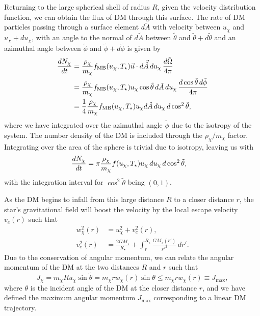 Returning to the large spherical shell of radius $R$, given the velocity distribution function, we can obtain the flux of DM through this surface. The rate of DM particles passing through a surface element $d\tilde{A}$ with velocity between $u_\chi$ and $u_\chi + du_\chi$, with an angle to the normal of $d\tilde{A}$ between $\tilde\theta$ and $\tilde \theta + d\tilde \theta$ and an azimuthal angle between $\tilde \phi$ and $\tilde \phi + d\tilde \phi$ is given by~\cite{Press:1985ug_Capturesungalactic}
\begin{align}
    \frac{dN_\chi}{dt} &= \frac{\rho_\chi}{m_\chi}f_{\mathrm{MB}}(u_\chi, T_\star) \vec{u}\cdot d\vec{\tilde{A}}\, d u_\chi\, \frac{d\tilde \Omega}{4\pi}\\
    & = \frac{\rho_\chi}{m_\chi}f_{\rm MB}(u_\chi, T_\star)u_\chi \cos\tilde\theta \,d\tilde{A}\, d u_\chi\,  \frac{d\cos\tilde\theta \,d\tilde\phi}{4\pi}\\
    & = \frac{1}{4}\frac{\rho_\chi}{m_\chi}f_{\rm MB}(u_\chi, T_\star)u_\chi d\tilde{A}\, d u_\chi\,d\cos^2\tilde\theta,
\end{align}
where we have integrated over the azimuthal angle $\tilde \phi$ due to the isotropy of the system. The number density of the DM is included through the $\rho_\chi/m_\chi$ factor. 
Integrating over the area of the sphere is trivial due to isotropy, leaving us with 
\begin{align}
    \frac{dN_\chi}{dt} &= \pi \frac{\rho_\chi}{m_\chi} f(u_\chi, T_\star)u_\chi\, d u_\chi \, d\cos^2\tilde\theta,
\end{align}
with the integration interval for $\cos^2\tilde\theta$ being $(0, 1)$.

As the DM begins to infall from this large distance $R$ to a closer distance $r$, the star's gravitational field will boost the velocity by the local escape velocity $v_e(r)$ such that
\begin{align}
    w^2_\chi(r) &= u^2_\chi + v_e^2(r),\\
    v_e^2(r) & = \frac{2 G M_\star}{R_\star} + \int_r^{R_\star} \frac{G M_\star(r')}{r'^2}\,dr'.
\end{align}
Due to the conservation of angular momentum, we can relate the angular momentum of the DM at the two distances $R$ and $r$ such that
\begin{equation}
    J_\chi = m_\chi R u_\chi \sin \tilde\theta = m_\chi r w_\chi(r) \sin\theta \leq m_\chi r w_\chi(r) \equiv J_{\mathrm{max}},
\end{equation}
where $\theta$ is the incident angle of the DM at the closer distance $r$, and we have defined the maximum angular momentum $J_{\mathrm{max}}$ corresponding to a linear DM trajectory.


